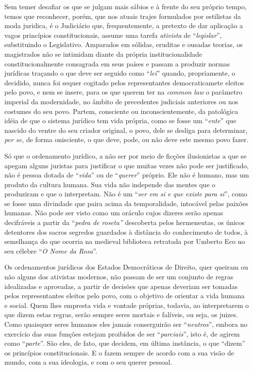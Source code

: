 Sem temer desafiar os que se julgam mais sábios e à frente do seu
próprio tempo, temos que reconhecer, porém, que nos atuais trajes
formulados por estilistas da moda juridica, é o Judiciário que,
frequentemente, a pretexto de dar aplicação a vagos princípios
constitucionais, assume uma tarefa \emph{ativista} de
``\emph{legislar}'', substituindo o Legislativo. Amparados em sólidas,
eruditas e ousadas teorias, os magistrados não se intimidam diante da
própria institucionalidade constitucionalmente consagrada em seus países
e passam a produzir normas jurídicas traçando o que deve ser seguido
como ``\emph{lei}'' quando, propriamente, o decidido, nunca foi sequer
cogitado pelos representantes democraticamete eleitos pelo povo, e nem
se insere, para os que querem ter na \emph{common law} o parâmetro
imperial da modernidade, no âmbito de precedentes judiciais anteriores
ou nos costumes do seu povo. Partem, consciente ou inconscientemente, da
patológica idéia de que o sistema jurídico tem vida própria, como se
fosse um ``\emph{ente}'' que nascido do ventre do seu criador original,
o povo, dele se desliga para determinar, \emph{per se,} de forma
onisciente, o que deve, pode, ou não deve este mesmo povo fazer.

Só que o ordenamento jurídico, a não ser por meio de ficções
ilusionistas a que se apegam alguns juristas para justificar o que
muitas vezes não pode ser justificado, não é pessoa dotada de
``\emph{vida}'' ou de ``\emph{querer}'' próprio. Ele não é humano, mas
um produto da cultura humana. Sua vida não independe das mentes que o
produziram e que o interpretam. Não é um ``\emph{ser em si e que existe
para si}'', como se fosse uma divindade que paira acima da
temporalidade, intocável pelas paixões humanas. Não pode ser visto como
um oráculo cujos dizeres serão apenas decifráveis a partir da
``\emph{pedra de roseta''} descoberta pelos hermeneutas, os únicos
detentores dos sacros segredos guardados à distância do conhecimento de
todos, à semelhança do que ocorria na medieval biblioteca retratada por
Umberto Eco no seu célebre ``\emph{O Nome da Rosa}''.

Os ordenamentos jurídicos dos Estados Democráticos de Direito, quer
queiram ou não alguns dos ativistas modernos, não passam de ser um
conjunto de regras idealizadas e aprovadas, a partir de decisões que
apenas deveriam ser tomadas pelos representantes eleitos pelo povo, com
o objetivo de orientar a vida humana e social. Quem lhes empresta vida e
vontade próprias, todavia, ao interpretarem o que dizem estas regras,
serão sempre seres mortais e falíveis, ou seja, os juizes. Como
quaisquer seres humanos eles jamais conserguirão ser ``\emph{neutros}'',
embora no exercício das suas funções estejam proibidos de ser
``\emph{parciais}'', isto é, de agirem como ``\emph{parte}''. São eles,
de fato, que decidem, em última instância, o que ``dizem'' os princípios
constitucionais. E o fazem sempre de acordo com a sua visão de mundo,
com a sua ideologia, e com o seu querer pessoal.

